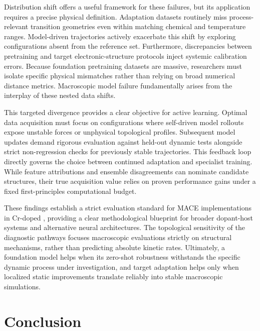 \documentclass[pdflatex,sn-mathphys-num]{sn-jnl}
\newif\ifreviewcopy
\newcommand{\rev}[2]{\ifreviewcopy{\color{revisionblue}#2\textsuperscript{\scriptsize[R1-#1]}}\else#2\fi}
\begin{document}
Distribution shift offers a useful framework for these failures, but its application requires a precise physical definition. Adaptation datasets routinely miss process-relevant transition geometries even within matching chemical and temperature ranges. Model-driven trajectories actively exacerbate this shift by exploring configurations absent from the reference set. Furthermore, discrepancies between pretraining and target electronic-structure protocols inject systemic calibration errors. Because foundation pretraining datasets are massive, researchers must isolate specific physical mismatches rather than relying on broad numerical distance metrics. Macroscopic model failure fundamentally arises from the interplay of these nested data shifts.

This targeted divergence provides a clear objective for active learning. Optimal data acquisition must focus on configurations where self-driven model rollouts expose unstable forces or unphysical topological profiles. Subsequent model updates demand rigorous evaluation against held-out dynamic tests alongside strict non-regression checks for previously stable trajectories. This feedback loop directly governs the choice between continued adaptation and specialist training. While feature attributions and ensemble disagreements can nominate candidate structures, their true acquisition value relies on proven performance gains under a fixed first-principles computational budget.

\rev{A4}{These findings establish a strict evaluation standard for MACE implementations in Cr-doped \ce{Sb2Te3}, providing a clear methodological blueprint for broader dopant-host systems and alternative neural architectures.} The topological sensitivity of the diagnostic pathways focuses macroscopic evaluations strictly on structural mechanisms, rather than predicting absolute kinetic rates. Ultimately, a foundation model helps when its zero-shot robustness withstands the specific dynamic process under investigation, and target adaptation helps only when localized static improvements translate reliably into stable macroscopic simulations.

\section{Conclusion}\label{sec:conclusion}
\end{document}
